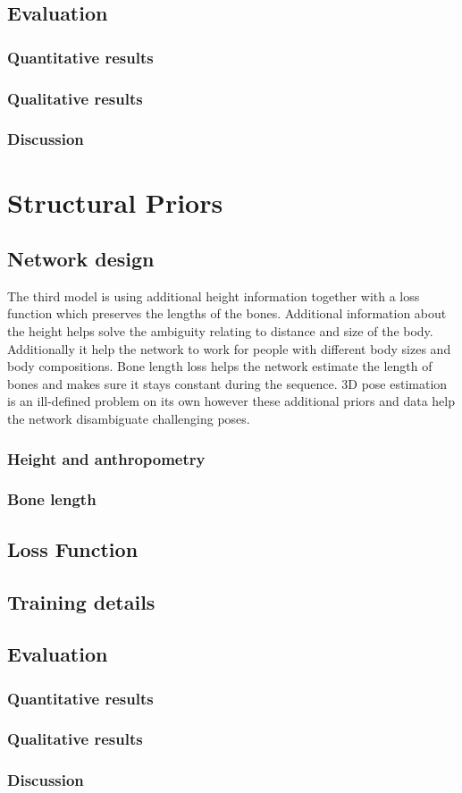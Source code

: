 \subsection{Evaluation}
\subsubsection{Quantitative results}
\subsubsection{Qualitative results}
\subsubsection{Discussion}

\section{Structural Priors}


\subsection{Network design}

The third model is using additional height information together with a loss function which preserves the lengths of the bones. Additional information about the height helps solve the ambiguity relating to distance and size of the body. Additionally it help the network to work for people with different body sizes and body compositions. Bone length loss helps the network estimate the length of bones and makes sure it stays constant during the sequence. 3D pose estimation is an ill-defined problem on its own however these additional priors and data help the network disambiguate challenging poses.

\subsubsection{Height and anthropometry}
\subsubsection{Bone length}
\subsection{Loss Function}
\subsection{Training details}
\subsection{Evaluation}
\subsubsection{Quantitative results}
\subsubsection{Qualitative results}
\subsubsection{Discussion}
